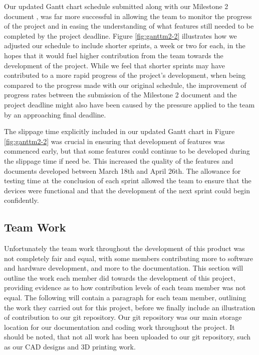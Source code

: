                 Our updated Gantt chart schedule submitted along with our Milestone 2 document \cite{mile2}, was far more successful in allowing the team to monitor the progress of the project and in easing the understanding of what features still needed to be completed by the project deadline. Figure \ref{fig:ganttm2-2} illustrates how we adjusted our schedule to include shorter sprints, a week or two for each, in the hopes that it would fuel higher contribution from the team towards the development of the project. While we feel that shorter sprints may have contributed to a more rapid progress of the project's development, when being compared to the progress made with our original schedule, the improvement of progress rates between the submission of the Milestone 2 document and the project deadline might also have been caused by the pressure applied to the team by an approaching final deadline.

                The slippage time explicitly included in our updated Gantt chart in Figure \ref{fig:ganttm2-2} was crucial in ensuring that development of features was commenced early, but that some features could continue to be developed during the slippage time if need be. This increased the quality of the features and documents developed between March 18th and April 26th. The allowance for testing time at the conclusion of each sprint allowed the team to ensure that the devices were functional and that the development of the next sprint could begin confidently. 

                

        \subsection{Team Work}

            Unfortunately the team work throughout the development of this product was not completely fair and equal, with some members contributing more to software and hardware development, and more to the documentation. This section will outline the work each member did towards the development of this project, providing evidence as to how contribution levels of each team member was not equal. The following will contain a paragraph for each team member, outlining the work they carried out for this project, before we finally include an illustration of contribution to our git repository. Our git repository was our main storage location for our documentation and coding work throughout the project. It should be noted, that not all work has been uploaded to our git repository, such as our CAD designs and 3D printing work.

